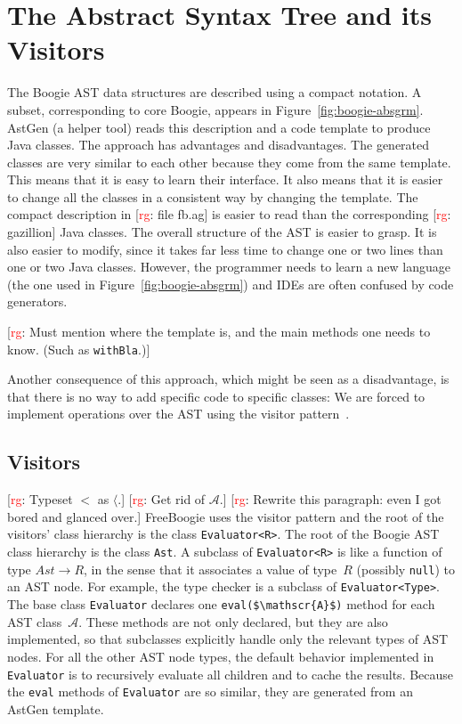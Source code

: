 \documentclass{llncs}
\newcommand{\jmlCode}{\lstinline[style=jml,basicstyle=\normalsize]}
\newcommand{\rg}[1]{{\small [\textcolor{red}{rg}: #1]}}
\begin{document}
\section{The Abstract Syntax Tree and its Visitors} %
\label{sec:ast}

The Boogie AST data structures are described using a compact notation. A
subset, corresponding to core Boogie, appears in
Figure~\ref{fig:boogie-absgrm}. AstGen (a helper tool) reads this
description and a code template to produce Java classes. The approach has
advantages and disadvantages. The generated classes are very similar to
each other because they come from the same template. This means that it is
easy to learn their interface.  It also means that it is easier to change
all the classes in a consistent way by changing the template. The compact
description in \rg{file fb.ag} is easier to read than the corresponding
\rg{gazillion} Java classes. The overall structure of the AST is easier to
grasp. It is also easier to modify, since it takes far less time to change
one or two lines than one or two Java classes. However, the programmer
needs to learn a new language (the one used in
Figure~\ref{fig:boogie-absgrm}) and IDEs are often confused by code
generators.

\rg{Must mention where the template is, and the main methods one needs to
know. (Such as \texttt{withBla}.)}

Another consequence of this approach, which might be seen as a
disadvantage, is that there is no way to add specific code to
specific classes: We are forced to implement operations over the
AST using the visitor pattern~\cite{gamma1995}.

\subsection{Visitors} %
\label{sec:visitors}

\rg{Typeset $<$ as $\langle$.}
\rg{Get rid of $\mathscr A$.}
\rg{Rewrite this paragraph: even I got bored and glanced over.}
FreeBoogie uses the visitor pattern and
the root of the visitors' class hierarchy is the class
\jmlCode|Evaluator<R>|. The root of the Boogie AST
class hierarchy is the class \jmlCode|Ast|. A subclass
of \jmlCode|Evaluator<R>| is like a function of type
$\mathit{Ast}\to R$, in the sense that it associates a
value of type~$R$ (possibly \jmlCode|null|) to an AST
node. For example, the type checker is a subclass of
\jmlCode|Evaluator<Type>|. The base class \jmlCode|Evaluator|
declares one \jmlCode|eval($\mathscr{A}$)| method for each AST
class~$\mathscr{A}$. These methods
are not only declared, but they are also implemented, so that
subclasses explicitly handle only the relevant types of AST
nodes. For all the other AST node types, the default behavior
implemented in \jmlCode|Evaluator| is to recursively evaluate all
children and to cache the results. Because the \jmlCode|eval|
methods of \jmlCode|Evaluator| are so similar, they are generated
from an AstGen template.
\end{document}
